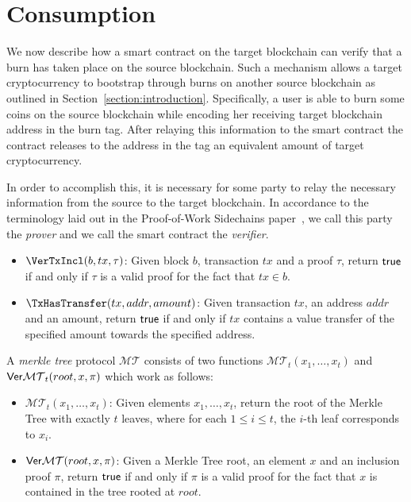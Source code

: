 \section{Consumption}

We now describe how a smart contract on the target blockchain can verify that a burn has taken place on the source blockchain. Such a mechanism allows a target cryptocurrency to bootstrap through burns on another source blockchain as outlined in Section~\ref{section:introduction}. Specifically, a user is able to burn some coins on the source blockchain while encoding her receiving target blockchain address in the burn tag. After relaying this information to the smart contract the contract releases to the address in the tag an equivalent amount of target cryptocurrency.

In order to accomplish this, it is necessary for some party to relay the necessary information from the source to the target blockchain. In accordance to the terminology laid out in the Proof-of-Work Sidechains paper~\cite{pow-sidechains}, we call this party the \emph{prover} and we call the smart contract the \emph{verifier}.

\begin{definition}
  \begin{itemize}
    \item $\VerTxIncl(b, tx, \tau)$: Given block $b$, transaction $tx$ and a proof $\tau$, return $\mathsf{true}$ if and only if $\tau$ is a valid proof for the fact that $tx \in b$.
    \item $\TxHasTransfer(tx, addr, amount)$: Given transaction $tx$, an address $addr$ and an amount, return $\mathsf{true}$ if and only if $tx$ contains a value transfer of the specified amount towards the specified address.
  \end{itemize}
\end{definition}

\begin{definition}
  A \emph{merkle tree} protocol $\mathcal{MT}$ consists of two functions $\mathcal{MT}_t(x_1, \dots, x_t)$ and $\mathsf{Ver}\mathcal{MT}_t(root, x, \pi)$ which work as follows:

  \begin{itemize}
    \item $\mathcal{MT}_t(x_1, \dots, x_t)$: Given elements $x_1, \dots, x_t$, return the root of the Merkle Tree with exactly $t$ leaves, where for each $1 \le i \le t$, the $i$-th leaf corresponds to $x_i$.

    \item $\mathsf{Ver}\mathcal{MT}(root, x, \pi)$: Given a Merkle Tree root, an element $x$ and an inclusion proof $\pi$, return $\sf{true}$ if and only if $\pi$ is a valid proof for the fact that $x$ is contained in the tree rooted at $root$.
  \end{itemize}
\end{definition}

